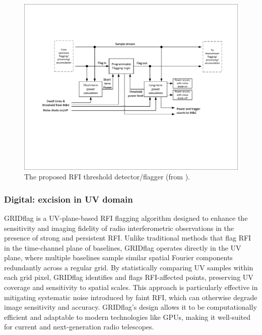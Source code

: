 \begin{figure}
    \centering
    \includegraphics[height=.28\textheight]{figures/RFI_DF_SKA_Mid_CBF.pdf}
    \caption{The proposed RFI threshold detector/flagger (from \citep{ska_mid_cbf_rfi_2019}).}
    \label{fig:rfi_df_ska_mid_cbf}
\end{figure}


\subsubsection{Digital: excision in UV domain}

GRIDflag \citep{10464448} is a UV-plane-based RFI flagging algorithm designed to enhance the sensitivity and imaging fidelity of radio interferometric observations in the presence of strong and persistent RFI. Unlike traditional methods that flag RFI in the time-channel plane of baselines, GRIDflag operates directly in the UV plane, where multiple baselines sample similar spatial Fourier components redundantly across a regular grid. By statistically comparing UV samples within each grid pixel, GRIDflag identifies and flags RFI-affected points, preserving UV coverage and sensitivity to spatial scales. This approach is particularly effective in mitigating systematic noise introduced by faint RFI, which can otherwise degrade image sensitivity and accuracy. GRIDflag's design allows it to be computationally efficient and adaptable to modern technologies like GPUs, making it well-suited for current and next-generation radio telescopes.

